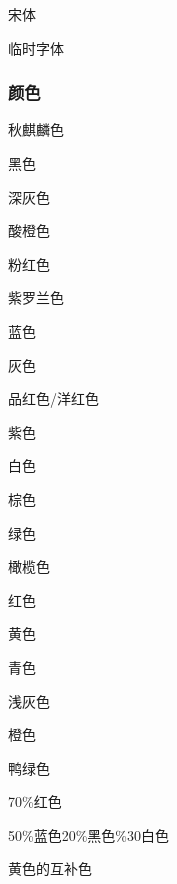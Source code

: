 \documentclass{ctexart}
\begin{document}
            {\songtii 宋体}

            { 临时字体}

        \subsubsection{颜色}\label{subsubsec:3.4.6}
            {\color{goldenrod}秋麒麟色}

            {\color{black}黑色}
            
            {\color{darkgray}深灰色}

            {\color{lime}酸橙色}

            {\color{pink}粉红色}

            {\color{violet}紫罗兰色}

            {\color{blue}蓝色}

            {\color{gray}灰色}

            {\color{magenta}品红色/洋红色}

            {\color{purple}紫色}

            {\color{white}白色}

            {\color{brown}棕色}

            {\color{green}绿色}

            {\color{olive}橄榄色}

            {\color{red}红色}

            {\color{yellow}黄色}

            {\color{cyan}青色}

            {\color{lightgray}浅灰色}

            {\color{orange}橙色}

            {\color{teal}鸭绿色}

            \textcolor{red!70}{70\%红色}

            \textcolor{blue!50!black!20!white}{50\%蓝色20\%黑色\%30白色}

            \textcolor{-yellow}{黄色的互补色}
\end{document}

